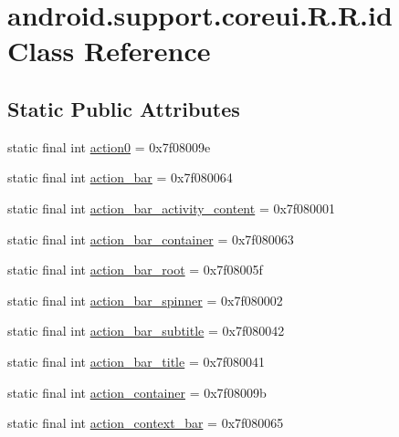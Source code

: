 \hypertarget{classandroid_1_1support_1_1coreui_1_1_r_1_1id}{
\section{android.support.coreui.R.R.id Class Reference}
\label{classandroid_1_1support_1_1coreui_1_1_r_1_1id}
}
\subsection*{Static Public Attributes}
\begin{CompactItemize}
\item 
static final int \hyperlink{classandroid_1_1support_1_1coreui_1_1_r_1_1id_f8af6009a6cbcf10af5fad6b8be0d5a2}{action0} = 0x7f08009e
\item 
static final int \hyperlink{classandroid_1_1support_1_1coreui_1_1_r_1_1id_4098a170f21b0752ee9dd90052e05d05}{action\_\-bar} = 0x7f080064
\item 
static final int \hyperlink{classandroid_1_1support_1_1coreui_1_1_r_1_1id_a3bbf275b72f4114fcde9ed254699045}{action\_\-bar\_\-activity\_\-content} = 0x7f080001
\item 
static final int \hyperlink{classandroid_1_1support_1_1coreui_1_1_r_1_1id_28457990bfe0fe3c057f6bb0993739ed}{action\_\-bar\_\-container} = 0x7f080063
\item 
static final int \hyperlink{classandroid_1_1support_1_1coreui_1_1_r_1_1id_805d18365423f1f4f54236e3e8df63de}{action\_\-bar\_\-root} = 0x7f08005f
\item 
static final int \hyperlink{classandroid_1_1support_1_1coreui_1_1_r_1_1id_c4ecc5e1ce8d75e034a556ba9fc90b60}{action\_\-bar\_\-spinner} = 0x7f080002
\item 
static final int \hyperlink{classandroid_1_1support_1_1coreui_1_1_r_1_1id_401e549a1c82535c78ef49c39137bf19}{action\_\-bar\_\-subtitle} = 0x7f080042
\item 
static final int \hyperlink{classandroid_1_1support_1_1coreui_1_1_r_1_1id_36b0ddcb9be9de42581838a1a78d37eb}{action\_\-bar\_\-title} = 0x7f080041
\item 
static final int \hyperlink{classandroid_1_1support_1_1coreui_1_1_r_1_1id_1b479ffc9017c935dbefefdb2d4ea6bb}{action\_\-container} = 0x7f08009b
\item 
static final int \hyperlink{classandroid_1_1support_1_1coreui_1_1_r_1_1id_3ef576c72c32719a4d4346cb8b59f86b}{action\_\-context\_\-bar} = 0x7f080065
\item 

\end{CompactItemize}
